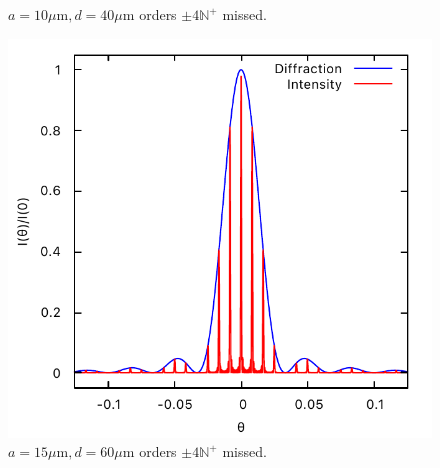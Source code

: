 \documentclass[11pt, twoside]{article}   	%
\theoremstyle{plain}
\theoremstyle{definition}
\begin{document}
\begin{description}
\begin{figure}[htbp]
\begin{minipage}[t]{0.33\linewidth}
		\caption{\centering $a = 10\mu\mathrm{m}, d = 40\mu\mathrm{m}$
			\newline orders $\pm 4\mathbb N^+$ missed.}
		\end{minipage}
		\begin{minipage}[t]{0.33\linewidth}
		\centering
		\includegraphics[width=0.9\linewidth]{15-60}
		\caption{\centering $a = 15\mu\mathrm{m}, d = 60\mu\mathrm{m}$
			\newline orders $\pm 4\mathbb N^+$ missed.}
		\end{minipage}
	\end{figure}
	\end{description}
\end{document}

